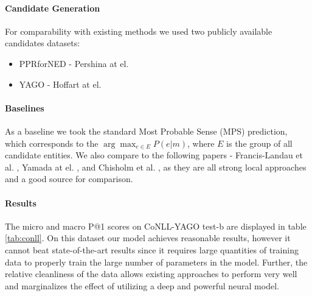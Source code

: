 \documentclass[11pt]{article}
\begin{document}
\paragraph{Candidate Generation}
For comparability with existing methods we used two publicly available candidates datasets:
\begin{itemize}
	\item PPRforNED - Pershina at el. 
	\item YAGO - Hoffart at el. 
\end{itemize}

\paragraph{Baselines}
As a baseline we took the standard Most Probable Sense (MPS) prediction, which corresponds to the $\arg\max_{e\in{{E}}}{P(e|m)}$, where $E$ is the group of all candidate entities.
We also compare to the following papers - Francis-Landau et al. ,  Yamada at el. , and Chisholm et al. , as they are all strong local approaches and a good source for comparison.


\paragraph{Results}
The micro and macro P@1 scores on CoNLL-YAGO test-b are displayed in table \ref{tab:conll}. On this dataset our model achieves reasonable results, however it cannot beat state-of-the-art results since it requires large quantities of training data to properly train the large number of parameters in the model. Further, the relative cleanliness of the data allows existing approaches to perform very well and marginalizes the effect of utilizing a deep and powerful neural model.
\end{document}
